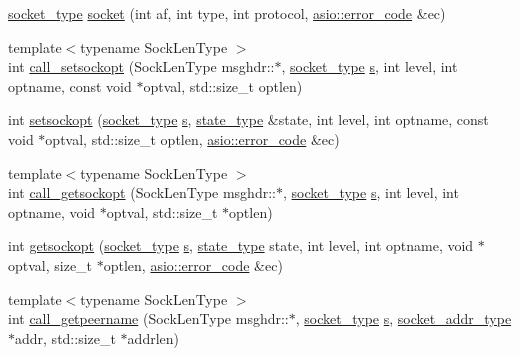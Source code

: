\begin{DoxyCompactItemize}
\item 
\hyperlink{namespaceasio_1_1detail_a6798c771dd84b79798b1a08150706ea9}{socket\+\_\+type} \hyperlink{namespaceasio_1_1detail_1_1socket__ops_a90aa9a854148c26da8232e25988623d8}{socket} (int af, int type, int protocol, \hyperlink{classasio_1_1error__code}{asio\+::error\+\_\+code} \&ec)
\item 
{\footnotesize template$<$typename Sock\+Len\+Type $>$ }\\int \hyperlink{namespaceasio_1_1detail_1_1socket__ops_acc4f63650d31eaa64dd3a57ab2b17471}{call\+\_\+setsockopt} (Sock\+Len\+Type msghdr\+::$\ast$, \hyperlink{namespaceasio_1_1detail_a6798c771dd84b79798b1a08150706ea9}{socket\+\_\+type} \hyperlink{group__async__connect_ga31ab74b9ea6c77932dddd016cfc7920a}{s}, int level, int optname, const void $\ast$optval, std\+::size\+\_\+t optlen)
\item 
int \hyperlink{namespaceasio_1_1detail_1_1socket__ops_a5b40bf739bd762eda69c07d002702919}{setsockopt} (\hyperlink{namespaceasio_1_1detail_a6798c771dd84b79798b1a08150706ea9}{socket\+\_\+type} \hyperlink{group__async__connect_ga31ab74b9ea6c77932dddd016cfc7920a}{s}, \hyperlink{namespaceasio_1_1detail_1_1socket__ops_a5ce32ee297edef8833113ea35a933054}{state\+\_\+type} \&state, int level, int optname, const void $\ast$optval, std\+::size\+\_\+t optlen, \hyperlink{classasio_1_1error__code}{asio\+::error\+\_\+code} \&ec)
\item 
{\footnotesize template$<$typename Sock\+Len\+Type $>$ }\\int \hyperlink{namespaceasio_1_1detail_1_1socket__ops_a41aee30c7f0f19e721ff462a8c8e80c7}{call\+\_\+getsockopt} (Sock\+Len\+Type msghdr\+::$\ast$, \hyperlink{namespaceasio_1_1detail_a6798c771dd84b79798b1a08150706ea9}{socket\+\_\+type} \hyperlink{group__async__connect_ga31ab74b9ea6c77932dddd016cfc7920a}{s}, int level, int optname, void $\ast$optval, std\+::size\+\_\+t $\ast$optlen)
\item 
int \hyperlink{namespaceasio_1_1detail_1_1socket__ops_a2f98481d00de572ace5ef4a983f892e1}{getsockopt} (\hyperlink{namespaceasio_1_1detail_a6798c771dd84b79798b1a08150706ea9}{socket\+\_\+type} \hyperlink{group__async__connect_ga31ab74b9ea6c77932dddd016cfc7920a}{s}, \hyperlink{namespaceasio_1_1detail_1_1socket__ops_a5ce32ee297edef8833113ea35a933054}{state\+\_\+type} state, int level, int optname, void $\ast$optval, size\+\_\+t $\ast$optlen, \hyperlink{classasio_1_1error__code}{asio\+::error\+\_\+code} \&ec)
\item 
{\footnotesize template$<$typename Sock\+Len\+Type $>$ }\\int \hyperlink{namespaceasio_1_1detail_1_1socket__ops_ad0ccca8eb7900ae75f969f2fff108595}{call\+\_\+getpeername} (Sock\+Len\+Type msghdr\+::$\ast$, \hyperlink{namespaceasio_1_1detail_a6798c771dd84b79798b1a08150706ea9}{socket\+\_\+type} \hyperlink{group__async__connect_ga31ab74b9ea6c77932dddd016cfc7920a}{s}, \hyperlink{namespaceasio_1_1detail_a40a7b0385a38f87815ffbb8df5e34d05}{socket\+\_\+addr\+\_\+type} $\ast$addr, std\+::size\+\_\+t $\ast$addrlen)

\end{DoxyCompactItemize}
